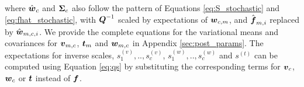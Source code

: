 where $\hat{\boldsymbol w}_c$ and $\boldsymbol \Sigma_{c}$ also follow the pattern of
Equations \ref{eq:S_stochastic} and \ref{eq:fhat_stochastic},
with $\boldsymbol Q^{-1}$ scaled by expectations of
$\boldsymbol w_{c,m}$,
 and $\hat{\boldsymbol f}_{m,i}$ replaced by $\hat{\boldsymbol w}_{m,c,i}$.
We provide the complete equations for the variational means 
and covariances for $\boldsymbol v_{m,c}$, $\boldsymbol t_m$ and $\boldsymbol w_{m,c}$ in 
Appendix \ref{sec:post_params}.
The expectations for inverse scales, $s^{(v)}_1,..,s^{(v)}_c$, $s^{(w)}_1,..,s^{(w)}_c$
 and $s^{(t)}$ can be computed using Equation \ref{eq:qs} by
substituting the corresponding terms for $\boldsymbol v_c$, $\boldsymbol w_c$ or $\boldsymbol t$ instead of $\boldsymbol f$. 


